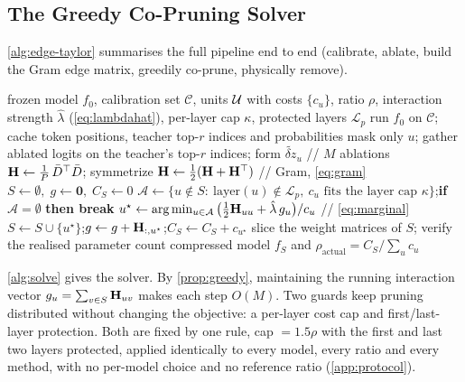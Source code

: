 \subsection{The Greedy Co-Pruning Solver}

\label{app:solver}

\cref{alg:edge-taylor} summarises the full \method pipeline end to end (calibrate, ablate, build the
Gram edge matrix, greedily co-prune, physically remove).
\begin{algorithm}[htbp]
\caption{\methodfull: end-to-end co-pruning pipeline.}
\label{alg:edge-taylor}
\begin{algorithmic}[1]
\REQUIRE frozen model $f_0$, calibration set $\mathcal{C}$, units $\mathcal{U}$ with costs $\{c_u\}$, ratio $\rho$,
  interaction strength $\hat\lambda$ (\cref{eq:lambdahat}), per-layer cap $\kappa$, protected layers $\mathcal{L}_p$
\STATE run $f_0$ on $\mathcal{C}$; cache token positions, teacher top-$r$ indices and probabilities
  \STATE mask only $u$; gather ablated logits on the teacher's top-$r$ indices; form $\widetilde{\delta z}_u$ \hfill // $M$ ablations
\ENDFOR
\STATE $\mathbf{H}\leftarrow \tfrac1P\,\bar D^\top \bar D$; symmetrize $\mathbf{H}\leftarrow\tfrac12(\mathbf{H}+\mathbf{H}^\top)$ \hfill // Gram, \cref{eq:gram}
\STATE $S\leftarrow\emptyset,\;g\leftarrow\mathbf{0},\;C_S\leftarrow0$
  \STATE $\mathcal{A}\leftarrow\{u\notin S:\ \mathrm{layer}(u)\notin\mathcal{L}_p,\ c_u\text{ fits the layer cap }\kappa\}$;\quad \textbf{if} $\mathcal{A}=\emptyset$ \textbf{then break}
  \STATE $u^\star\leftarrow\arg\min_{u\in\mathcal{A}}\big(\tfrac12\mathbf{H}_{uu}+\hat\lambda\,g_u\big)/c_u$ \hfill // \cref{eq:marginal}
  \STATE $S\leftarrow S\cup\{u^\star\}$;\quad $g\leftarrow g+\mathbf{H}_{:,u^\star}$;\quad $C_S\leftarrow C_S+c_{u^\star}$
\ENDWHILE
\STATE slice the weight matrices of $S$; verify the realised parameter count
\RETURN compressed model $f_S$ and $\rho_{\mathrm{actual}}=C_S/\sum_u c_u$
\end{algorithmic}
\end{algorithm}
\cref{alg:solve} gives the solver. By \cref{prop:greedy}, maintaining the running interaction vector
$g_u=\sum_{v\in S}\mathbf{H}_{uv}$ makes each step $O(M)$. Two guards keep pruning distributed without
changing the objective: a per-layer cost cap and first/last-layer protection. Both are fixed by one
rule, cap $=1.5\rho$ with the first and last two layers protected, applied identically to every
model, every ratio and every method, with no per-model choice and no reference ratio
(\cref{app:protocol}).

